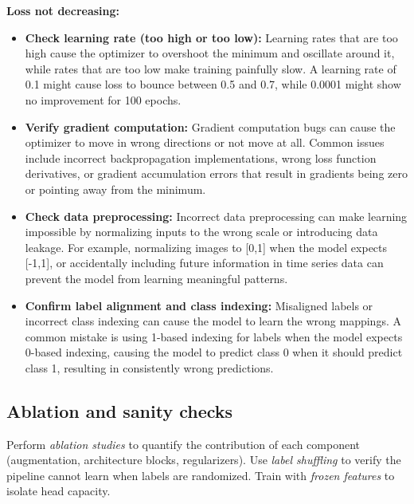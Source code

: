 \textbf{Loss not decreasing:}
\begin{itemize}
    \item \textbf{Check learning rate (too high or too low):} Learning rates that are too high cause the optimizer to overshoot the minimum and oscillate around it, while rates that are too low make training painfully slow. A learning rate of 0.1 might cause loss to bounce between 0.5 and 0.7, while 0.0001 might show no improvement for 100 epochs.
    
    \item \textbf{Verify gradient computation:} Gradient computation bugs can cause the optimizer to move in wrong directions or not move at all. Common issues include incorrect backpropagation implementations, wrong loss function derivatives, or gradient accumulation errors that result in gradients being zero or pointing away from the minimum.
    
    \item \textbf{Check data preprocessing:} Incorrect data preprocessing can make learning impossible by normalizing inputs to the wrong scale or introducing data leakage. For example, normalizing images to [0,1] when the model expects [-1,1], or accidentally including future information in time series data can prevent the model from learning meaningful patterns.
    
    \item \textbf{Confirm label alignment and class indexing:} Misaligned labels or incorrect class indexing can cause the model to learn the wrong mappings. A common mistake is using 1-based indexing for labels when the model expects 0-based indexing, causing the model to predict class 0 when it should predict class 1, resulting in consistently wrong predictions.
\end{itemize}

\subsection{Ablation and sanity checks}

Perform \emph{ablation studies}  to quantify the contribution of each component (augmentation, architecture blocks, regularizers). Use \emph{label shuffling} to verify the pipeline cannot learn when labels are randomized. Train with \emph{frozen features} to isolate head capacity.



